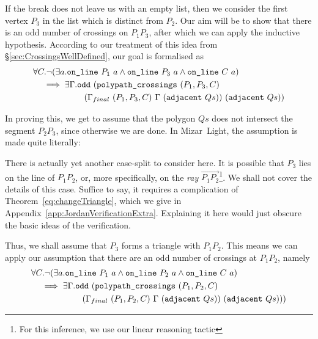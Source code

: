 If the break does not leave us with an empty list, then we consider the first vertex $P_3$ in the list which is distinct from $P_2$. Our aim will be to show that there is an odd number of crossings on $P_1P_3$, after which we can apply the inductive hypothesis. According to our treatment of this idea from \S\ref{sec:CrossingsWellDefined}, our goal is formalised as
\begin{equation*}
  \begin{aligned}
    &\forall C. \neg(\exists a.\texttt{on\_line}\ P_1\ a\wedge \texttt{on\_line}\ P_3\ a\wedge \texttt{on\_line}\ C\ a)\\
    &\quad \implies \exists \Gamma. \texttt{odd}\ (\texttt{polypath\_crossings}\ (P_1,P_3,C)\\
    &\qquad\qquad\qquad(\Gamma_{final}\ (P_1,P_3,C)\ \Gamma\ (\texttt{adjacent}\ Qs))\ (\texttt{adjacent}\ Qs))
  \end{aligned}
\end{equation*}

In proving this, we get to assume that the polygon $Qs$ does not intersect the segment $P_2P_3$, since otherwise we are done. In Mizar~Light, the assumption is made quite literally:

\begin{center}\end{center}

There is actually yet another case-split to consider here. It is possible that $P_3$ lies on the line of $P_1P_2$, or, more specifically, on the \emph{ray} $\overrightarrow{P_1P_2}$\footnote{For this inference, we use our linear reasoning tactic}. We shall not cover the details of this case. Suffice to say, it requires a complication of Theorem~\ref{eq:changeTriangle}, which we give in Appendix~\ref{app:JordanVerificationExtra}. Explaining it here would just obscure the basic ideas of the verification.

Thus, we shall assume that $P_3$ forms a triangle with $P_1P_2$. This means we can apply our assumption that there are an odd number of crossings at $P_1P_2$, namely
\begin{align*}&\forall C. \neg(\exists a.\texttt{on\_line}\ P_1\ a\wedge \texttt{on\_line}\ P_2\ a\wedge \texttt{on\_line}\ C\ a)\\
    &\quad\implies \exists \Gamma. \texttt{odd}\ (\texttt{polypath\_crossings}\ (P_1,P_2,C)\\
    &\qquad\qquad\qquad(\Gamma_{final}\ (P_1,P_2,C)\ \Gamma\ (\texttt{adjacent}\ Qs))\ (\texttt{adjacent}\ Qs)))
\end{align*}

